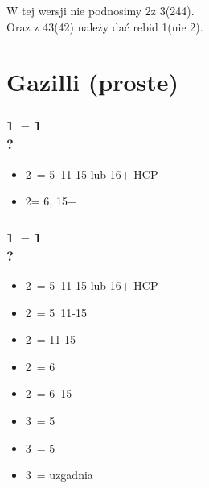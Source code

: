 \documentclass[12pt, a4paper]{report}
\begin{document}
{    W tej wersji nie podnosimy 2\spades z 3(244).\\
    Oraz z 43(42) należy dać rebid 1\spades (nie 2\hearts).
}

\section*{\colorbox{blue!30}{Gazilli (proste)}}
 {

    \subsubsection*{1\hearts\ -- 1\spades\ \\ ?}
    \begin{itemize}
        \item 2\clubs\ = 5\clubs\ 11-15 lub 16+ HCP \fonce
        \item 2\nt = 6\minor, 15+
    \end{itemize}

    \subsubsection*{1\hearts\ -- 1\ntx\ \\ ?}
    \begin{itemize}
        \item 2\clubs\ = 5\hearts\clubs\ 11-15 lub 16+ HCP \fonce
        \item 2\diams\ = 5\diams\ 11-15
        \item 2\hearts\ = 11-15
        \item 2\spades\ = 6\spades\ \gf
        \item 2\ntx\ = 6\minor\ 15+
        \item 3\clubs\ = 5\clubs\ \gf
        \item 3\diams\ = 5\diams\ \gf
        \item 3\hearts\ = uzgadnia \hearts\ \gf
    \end{itemize}

}
\end{document}
